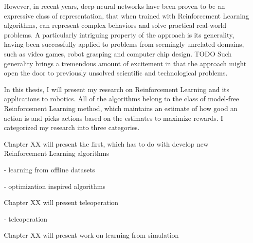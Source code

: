 However, in recent years, deep neural networks have been proven 
to be an expressive class of representation, that when trained with Reinforcement
Learning algorithms, can represent complex behaviors and 
solve practical real-world problems. 
A particularly intriguing property of the approach is 
its generality, having been successfully applied 
to problems from seemingly unrelated domains,
such as video games, robot grasping and computer chip design. TODO
Such generality brings a tremendous amount of excitement 
in that the approach 
might open the door to previously unsolved scientific and 
technological problems.

In this thesis, I will present my research on Reinforcement Learning 
and its applications to robotics. 
All of the algorithms belong to the class of model-free 
Reinforcement Learning method, which maintains 
an estimate of how good an action is and picks 
actions based on the estimates to maximize rewards. 
I categorized my research into three categories.

Chapter XX will present the first, which has to do with 
develop new Reinforcement Learning algorithms 

- learning from offline datasets 

- optimization inspired algorithms 

Chapter XX will present teleoperation 

- teleoperation 

Chapter XX will present work on learning 
from simulation